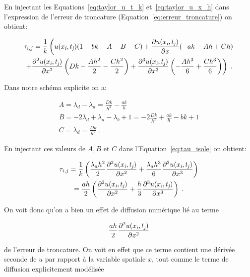 \documentclass[a4paper, 12pt]{report}
\begin{document}
En injectant les Equations~\ref{eq:taylor_u_t_k} et~\ref{eq:taylor_u_x_h} dans
l'expression de l'erreur de troncature (Equation~\ref{eq:erreur_troncature}) on
obtient:

\begin{multline}
  \tau_{i,j} = \frac{1}{k} \left (u(x_{\textsl{i}},t_{\textsl{j}}) (1-bk-A-B-C) + \frac{\partial u(x_{\textsl{i}},t_{\textsl{j}})}{\partial x} (-ak -Ah + Ch) \right.\\
   \left. + \frac{\partial^2 u(x_{\textsl{i}},t_{\textsl{j}})}{\partial x^2} \left (Dk - \frac{A h^2}{2} - \frac{C h^2}{2} \right ) + \frac{\partial^3 u(x_{\textsl{i}},t_{\textsl{j}})}{\partial x^3} \left (-\frac{Ah^3}{6} + \frac{C h^3}{6} \right )  \right )\;.
   \label{eq:tau_isole}
\end{multline}

Dans notre schéma explicite on a:

\begin{align}
  A = \lambda_d - \lambda_a = \frac{Dk}{h^2} - \frac{ak}{h}\\
  B = -2 \lambda_d + \lambda_a - \lambda_b +1 = -2 \frac{Dk}{h^2} + \frac{ak}{h} - bk +1\\
  C = \lambda_d = \frac{Dk}{h^2}\;.
\end{align}

En injectant ces valeurs de $A,B$ et $C$ dans l'Equation~\ref{eq:tau_isole} on obtient:

\begin{multline}
  \tau_{i,j} = \frac{1}{k} \left ( \frac{\lambda_a h^2}{2} \frac{\partial^2 u(x_{\textsl{i}},t_{\textsl{j}})}{\partial x^2} + \frac{\lambda_a h^3}{6} \frac{\partial^3 u(x_{\textsl{i}},t_{\textsl{j}})}{\partial x^3} \right)\\
  = \frac{a h}{2} \left ( \frac{\partial^2 u(x_{\textsl{i}},t_{\textsl{j}})}{\partial x^2} + \frac{h}{3} \frac{\partial^3 u(x_{\textsl{i}},t_{\textsl{j}})}{\partial x^3} \right ) \;.
\end{multline}

On voit donc qu'on a bien un effet de diffusion numérique lié au terme

\begin{equation}
  \frac{a h}{2} \frac{\partial^2 u(x_{\textsl{i}},t_{\textsl{j}})}{\partial x^2}
  \label{eq:terme_diffusion_numerique}
\end{equation}

de l'erreur de troncature. On voit en effet que ce terme contient une dérivée
seconde de $u$ par rapport à la variable spatiale $x$, tout comme le terme
de diffusion explicitement modélisée
\end{document}
